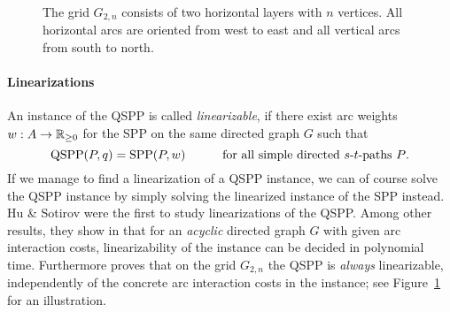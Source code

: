 \documentclass[runningheads]{llncs}
\begin{document}
\begin{figure}[t]
\begin{center}
\end{center}
\caption{The grid $G_{2,n}$ consists of two horizontal layers with $n$ vertices.
All horizontal arcs are oriented from west to east and all vertical arcs from south to north.}
\label{fig:grid}
\end{figure}

\paragraph*{Linearizations}
An instance of the QSPP is called \emph{linearizable}, if there exist arc weights $w:A\to{\mathbb{R}_{\ge0}}$
for the SPP on the same directed graph $G$ such that
\begin{equation}
\label{eq:linearizable}
\text{QSPP}(P,q) = \text{SPP}(P,w) \text{\qquad\quad for all simple directed $s$-$t$-paths $P$.}
\end{equation}
If we manage to find a linearization of a QSPP instance, we can of course solve the QSPP instance
by simply solving the linearized instance of the SPP instead.
Hu \& Sotirov \cite{HuSo2018a,HuSo2018b} were the first to study linearizations of the QSPP.
Among other results, they show in \cite{HuSo2018b} that for an \emph{acyclic} directed graph $G$
with given arc interaction costs, linearizability of the instance can be decided in polynomial time.
Furthermore \cite{HuSo2018a} proves that on the grid $G_{2,n}$ the QSPP is \emph{always} linearizable,
independently of the concrete arc interaction costs in the instance;
see Figure~\ref{fig:grid} for an illustration.
\end{document}
